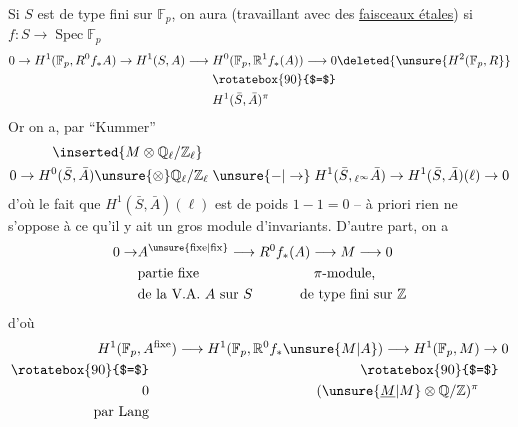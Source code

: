 Si $S$ est de type fini sur $\mathbb{F}_p$, on %
aura (travaillant avec des \uline{faisceaux %
étales}) si $f:S\longrightarrow\operatorname{Spec}\mathbb{F}_p$ %
\[
\begin{aligned}
0\to H^1(\mathbb{F}_p,R^0f_*A)\to H^1(S,A)\longrightarrow {}&
 H^0(\mathbb{F}_p,\mathbb{R}^1f_*(A))\longrightarrow0
 \deleted{\unsure{H^2(\mathbb{F}_p,R}}\\ %
&\rotatebox{90}{$=$}\\
&H^1(\bar S,\bar A)^\pi %
\end{aligned}
\]
Or on a,  par \textquotedblleft Kummer\textquotedblright %
\[
\begin{aligned}
&\quad\inserted{M\otimes\mathbb{Q}_\ell/\mathbb{Z}_\ell}\\ %
0\to{}&H^0(\bar S,\bar A)\unsure{\otimes}\mathbb{Q}_\ell/\mathbb{Z}_\ell
 \;\unsure{-|\to}\; H^1(\bar S,{}_{\ell^\infty}\bar A)
 \to H^1(\bar S,\bar A)(\ell)\to0 %
\end{aligned}
\]
d'où le fait que $H^1(\bar S,\bar A)(\ell)$ est de %
poids $1-1=0$  -- à priori rien ne s'oppose %
à ce qu'il y ait un gros module %
d'invariants. D'autre part, on a %
\[
\begin{aligned}
0\to &A^{\text{\unsure{fixe|fix}}}\longrightarrow R^0f_*(A)\longrightarrow M\longrightarrow 0\\ %
&\text{partie fixe}\hspace{29mm}\pi\text{-module,}\\ %
&\text{de la V.A. }A\text{ sur }S\hspace{12mm}\text{de type fini sur }\mathbb{Z}
\end{aligned} %
\]
d'où %
\[
\begin{aligned}
H^1(\mathbb{F}_p,A^{\text{fixe}})&\longrightarrow H^1(\mathbb{F}_p,\mathbb{R}^0f_*\unsure{M|A})
 \longrightarrow H^1(\mathbb{F}_p,M)\to0\\ %
\rotatebox{90}{$=$}\qquad&\hspace{46mm}\rotatebox{90}{$=$}\\
0\qquad&\hspace{35mm}(\unsure{\underline M|M}\otimes\mathbb{Q}/\mathbb{Z})^\pi\\ %
\text{par Lang}\qquad&
\end{aligned} %
\]
